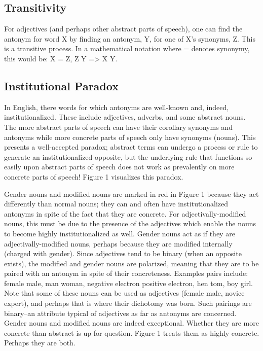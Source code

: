 \subsection {Transitivity} For adjectives (and perhaps other abstract parts of speech), one can find the antonym for word X by finding an antonym, Y, for one of X’s synonyms, Z.  This is a transitive process.  In a mathematical notation where = denotes synonymy, this would be: X = Z, Z \opp Y => X \opp Y.

\subsection {Institutional Paradox} In English, there words for which antonyms are well-known and, indeed, institutionalized.  These include adjectives, adverbs, and some abstract nouns.  The more abstract parts of speech can have their corollary synonyms and antonyms while more concrete parts of speech only have synonyms (nouns). This presents a well-accepted paradox; abstract terms can undergo a process or rule to generate an institutionalized opposite, but the underlying rule that functions so easily upon abstract parts of speech does not work as prevalently on more concrete parts of speech!  Figure 1 visualizes this paradox.

Gender nouns and modified nouns are marked in red in Figure 1 because they act differently than normal nouns; they can and often have institutionalized antonyms in spite of the fact that they are concrete.  For adjectivally-modified nouns, this must be due to the presence of the adjectives which enable the nouns to become highly institutionalized as well.  Gender nouns act as if they are adjectivally-modified nouns, perhaps because they are modified internally (charged with gender).  Since adjectives tend to be binary (when an opposite exists), the modified and gender nouns are polarized, meaning that they are to be paired with an antonym in spite of their concreteness.  Examples pairs include: female \opp male, man \opp woman, negative electron \opp positive electron, hen \opp tom, boy \opp girl.  Note that some of these nouns can be used as adjectives (female \opp male, novice \opp expert), and perhaps that is where their dichotomy was born.  Such pairings are binary--an attribute typical of adjectives as far as antonyms are concerned.  Gender nouns and modified nouns are indeed exceptional.  Whether they are more concrete than abstract is up for question.  Figure 1 treats them as highly concrete.  Perhaps they are both.    


